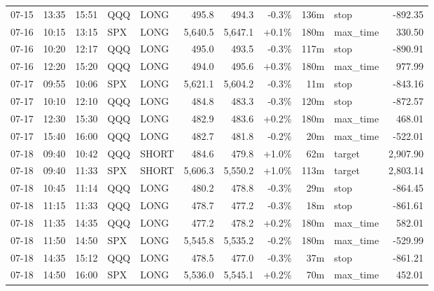 \documentclass[11pt,a4paper,twoside]{article}
\begin{document}
\begin{center}
\begin{longtable}{>{\color{txtmain}}l l l l l r r r r >{\color{txtmain}}l r}
07-15 & 13:35 & 15:51 & QQQ & LONG & 495.8 & 494.3 & \textcolor{lossred}{-0.3\%} & 136m & stop & \textcolor{lossred}{-892.35} \\
07-16 & 10:15 & 13:15 & SPX & LONG & 5,640.5 & 5,647.1 & \textcolor{wingreen}{+0.1\%} & 180m & max\_time & \textcolor{wingreen}{330.50} \\
07-16 & 10:20 & 12:17 & QQQ & LONG & 495.0 & 493.5 & \textcolor{lossred}{-0.3\%} & 117m & stop & \textcolor{lossred}{-890.91} \\
07-16 & 12:20 & 15:20 & QQQ & LONG & 494.0 & 495.6 & \textcolor{wingreen}{+0.3\%} & 180m & max\_time & \textcolor{wingreen}{977.99} \\
07-17 & 09:55 & 10:06 & SPX & LONG & 5,621.1 & 5,604.2 & \textcolor{lossred}{-0.3\%} & 11m & stop & \textcolor{lossred}{-843.16} \\
07-17 & 10:10 & 12:10 & QQQ & LONG & 484.8 & 483.3 & \textcolor{lossred}{-0.3\%} & 120m & stop & \textcolor{lossred}{-872.57} \\
07-17 & 12:30 & 15:30 & QQQ & LONG & 482.9 & 483.6 & \textcolor{wingreen}{+0.2\%} & 180m & max\_time & \textcolor{wingreen}{468.01} \\
07-17 & 15:40 & 16:00 & QQQ & LONG & 482.7 & 481.8 & \textcolor{lossred}{-0.2\%} & 20m & max\_time & \textcolor{lossred}{-522.01} \\
07-18 & 09:40 & 10:42 & QQQ & SHORT & 484.6 & 479.8 & \textcolor{wingreen}{+1.0\%} & 62m & target & \textcolor{wingreen}{2,907.90} \\
07-18 & 09:40 & 11:33 & SPX & SHORT & 5,606.3 & 5,550.2 & \textcolor{wingreen}{+1.0\%} & 113m & target & \textcolor{wingreen}{2,803.14} \\
07-18 & 10:45 & 11:14 & QQQ & LONG & 480.2 & 478.8 & \textcolor{lossred}{-0.3\%} & 29m & stop & \textcolor{lossred}{-864.45} \\
07-18 & 11:15 & 11:33 & QQQ & LONG & 478.7 & 477.2 & \textcolor{lossred}{-0.3\%} & 18m & stop & \textcolor{lossred}{-861.61} \\
07-18 & 11:35 & 14:35 & QQQ & LONG & 477.2 & 478.2 & \textcolor{wingreen}{+0.2\%} & 180m & max\_time & \textcolor{wingreen}{582.01} \\
07-18 & 11:50 & 14:50 & SPX & LONG & 5,545.8 & 5,535.2 & \textcolor{lossred}{-0.2\%} & 180m & max\_time & \textcolor{lossred}{-529.99} \\
07-18 & 14:35 & 15:12 & QQQ & LONG & 478.5 & 477.0 & \textcolor{lossred}{-0.3\%} & 37m & stop & \textcolor{lossred}{-861.21} \\
07-18 & 14:50 & 16:00 & SPX & LONG & 5,536.0 & 5,545.1 & \textcolor{wingreen}{+0.2\%} & 70m & max\_time & \textcolor{wingreen}{452.01} \\

\end{longtable}
\end{center}
\end{document}
